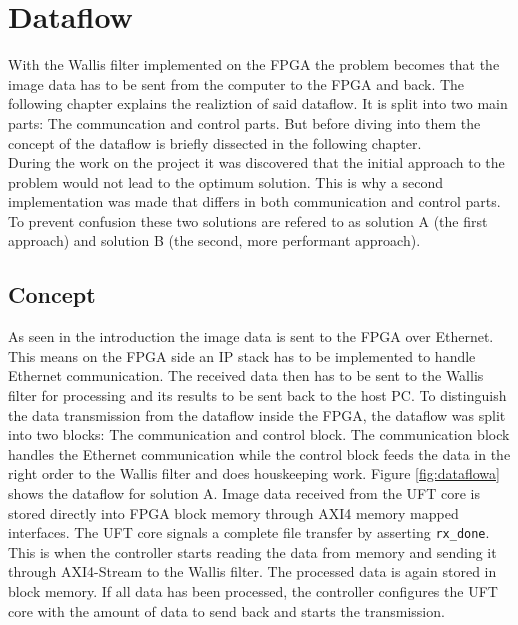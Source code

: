 %
%
\chapter{Dataflow} \label{chapt:dataflow}
With the Wallis filter implemented on the FPGA the problem becomes that the
image data has to be sent from the computer to the FPGA and back. The following
chapter explains the realiztion of said dataflow. It is split into two main
parts: The communcation and control parts. But before diving into them the
concept of the dataflow is briefly dissected in the following chapter.\\

During the work on the project it was discovered that the initial approach to
the problem would not lead to the optimum solution. This is why a second
implementation was made that differs in both communication and control parts. To
prevent confusion these two solutions are refered to as solution A (the first
approach) and solution B (the second, more performant approach).

\section{Concept} \label{ch:concept}
As seen in the introduction the image data is sent to the FPGA over Ethernet.
This means on the FPGA side an IP stack has to be implemented to handle Ethernet
communication. The received data then has to be sent to the Wallis filter for
processing and its results to be sent back to the host PC. To distinguish the
data transmission from the dataflow inside the FPGA, the dataflow was split into
two blocks: The communication and control block. The communication block handles
the Ethernet communication while the control block feeds the data in the right
order to the Wallis filter and does houskeeping work. Figure \ref{fig:dataflowa}
shows the dataflow for solution A.
\clearpage
Image data received from the UFT core is stored directly into FPGA block memory
through AXI4 memory mapped interfaces. The UFT core signals a complete file
transfer by asserting \texttt{rx\_done}. This is when the controller starts
reading the data from memory and sending it through AXI4-Stream to the Wallis
filter. The processed data is again stored in block memory. If all data has been
processed, the controller configures the UFT core with the amount of data to
send back and starts the transmission.

